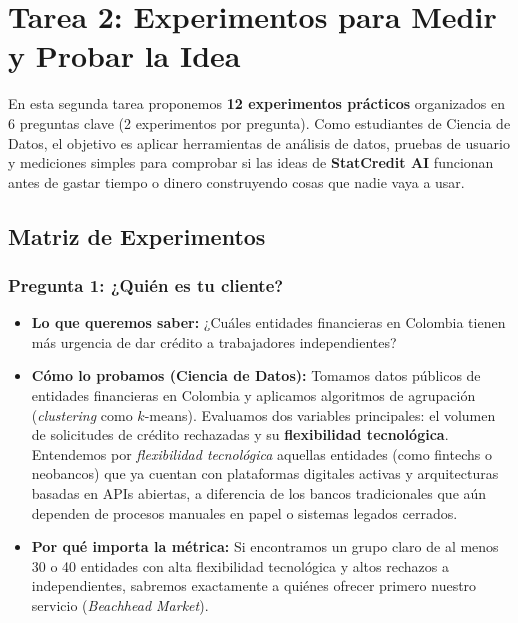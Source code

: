 \documentclass[11pt,a4paper]{article}
\begin{document}
\section{Tarea 2: Experimentos para Medir y Probar la Idea}

\begin{tcolorbox}[colback=primary!5,colframe=primary,title=\textbf{¿De qué trata este entregable?}]
En esta segunda tarea proponemos \textbf{12 experimentos prácticos} organizados en 6 preguntas clave (2 experimentos por pregunta). Como estudiantes de Ciencia de Datos, el objetivo es aplicar herramientas de análisis de datos, pruebas de usuario y mediciones simples para comprobar si las ideas de \textbf{StatCredit AI} funcionan antes de gastar tiempo o dinero construyendo cosas que nadie vaya a usar.
\end{tcolorbox}

\subsection{Matriz de Experimentos}

\subsubsection{Pregunta 1: ¿Quién es tu cliente?}

\begin{tcolorbox}[colback=lightgray,colframe=secondary,title=\textbf{Experimento 1.1: Agrupar empresas para encontrar nuestro primer cliente}]
\begin{itemize}[leftmargin=*]
    \item \textbf{Lo que queremos saber:} ¿Cuáles entidades financieras en Colombia tienen más urgencia de dar crédito a trabajadores independientes?
    \item \textbf{Cómo lo probamos (Ciencia de Datos):} Tomamos datos públicos de entidades financieras en Colombia y aplicamos algoritmos de agrupación (\textit{clustering} como $k$-means). Evaluamos dos variables principales: el volumen de solicitudes de crédito rechazadas y su \textbf{flexibilidad tecnológica}. Entendemos por \textit{flexibilidad tecnológica} aquellas entidades (como fintechs o neobancos) que ya cuentan con plataformas digitales activas y arquitecturas basadas en APIs abiertas, a diferencia de los bancos tradicionales que aún dependen de procesos manuales en papel o sistemas legados cerrados.
    \item \textbf{Por qué importa la métrica:} Si encontramos un grupo claro de al menos 30 o 40 entidades con alta flexibilidad tecnológica y altos rechazos a independientes, sabremos exactamente a quiénes ofrecer primero nuestro servicio (\textit{Beachhead Market}).
\end{itemize}
\end{tcolorbox}
\end{document}
